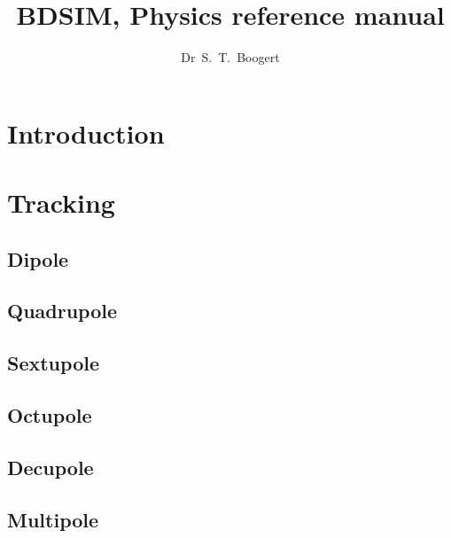 \documentclass[11pt]{article}                                                          	%
\title{BDSIM, Physics reference manual}
\author{Dr~S.~T.~Boogert} 								%
\date{}
\begin{document}
\maketitle
\section{Introduction \label{sec:Introduction}}

\section{Tracking \label{sec:Tracking}}

\subsection{Dipole}
\subsection{Quadrupole}
\subsection{Sextupole}
\subsection{Octupole}
\subsection{Decupole}
\subsection{Multipole}
\end{document}
